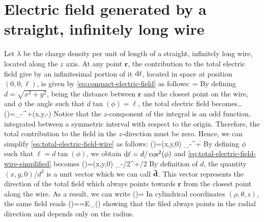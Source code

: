 \section{Electric field generated by a straight, infinitely long wire}
Let $\lambda$ be the charge density per unit of length of a straight, infinitely long wire, located along the $z$ axis. At any point $\mathbf{r}$, the contribution to the total electric field give by an infinitesimal portion of it $\mathrm{d}\ell$, located in space at position $(0,0,\ell)$, is given by \ref{eq:compact-electric-field} as follows:
\be\label{eq:infinitesimal-electric-field-wire}
=
\ee
By defining $d=\sqrt{x^{2}+y^{2}}$, being the distance between $\mathbf{r}$ and the closest point on the wire, and $\phi$ the angle such that $d\tan(\phi)=\ell$, the total electric field becomes\dots
\be\label{eq:total-electric-field-wire}
()=\int_{-\infty}^{+\infty}(x,y,-\ell)
\ee
Notice that the $z$-component of the integral is an odd function, integrated between a symmetric interval with respect to the origin. Therefore, the total contribution to the field in the $z$-direction must be zero. Hence, we can simplify \ref{eq:total-electric-field-wire} as follows:
\be\label{eq:total-electric-field-wire-simplified}
()=(x,y,0) \int_{-\infty}^{+\infty}
\ee
By defining $\phi$ such that $\ell=d\tan(\phi)$, we obtain $\mathrm{d}\ell=d/\cos^{2}(\phi)$ and \ref{eq:total-electric-field-wire-simplified} becomes
\be\label{eq:total-electric-field-wire-using-phi}
()=(x,y,0) \int_{-\pi/2}^{+\pi/2}
\ee
By definition of $d$, the quantity $(x,y,0)/d^{2}$ is a unit vector which we can call $\boldsymbol{\hat{\textbf{$\mathrm d$}}}$. This vector represents the direction of the total field which always points towards $\mathbf{r}$ from the closest point along the wire. As a result, we can write
\be\label{eq:total-electric-field-wire-final}
()=
\ee
In cylindrical coordinates $(\rho,\theta,z)$, the same field reads
\be
{}()=\uvec{\rho}=E_{\rho}(\rho)\uvec{\rho}
\ee
showing that the filed always points in the radial direction and depends only on the radius.
